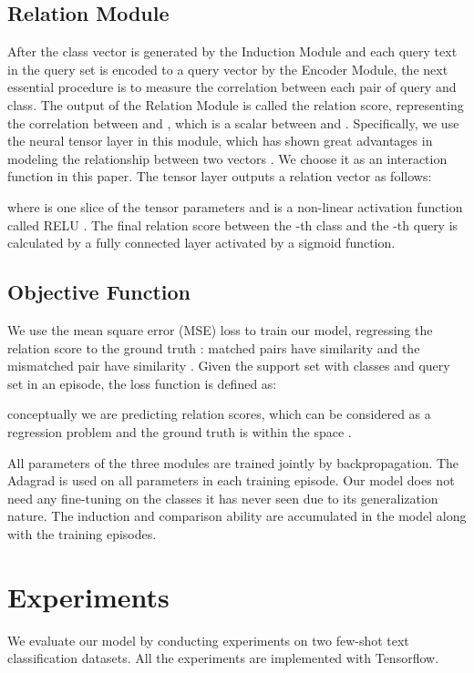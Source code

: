\documentclass[11pt,a4paper]{article}
\begin{document}
\subsection{Relation Module}
After the class vector  is generated by the Induction Module and each query text in the query set is encoded to a query vector  by the Encoder Module, the next essential procedure is to measure the correlation between each pair of query and class.
The output of the Relation Module is called the relation score, representing the correlation between  and , which is a scalar between  and . Specifically, we use the neural tensor layer \citep{socher2013reasoning} in this module, which has shown great advantages in modeling the relationship between two vectors \citep{wan2016deep,geng2017implicit}. We choose it as an interaction function in this paper. The tensor layer outputs a relation vector as follows:

where  is one slice of the tensor parameters and  is a non-linear activation function called RELU \citep{glorot2011deep}. The final relation score  between the -th class and the -th query is calculated by a fully connected layer activated by a sigmoid function.


\subsection{Objective Function}
We use the mean square error (MSE) loss to train our model, regressing the relation score  to the ground truth : matched pairs have similarity  and the mismatched pair have similarity . Given the support set  with  classes and query set  in an episode, the loss function is defined as:

conceptually we are predicting relation scores, which can be considered as a regression problem and the ground truth is within the space .

All parameters of the three modules are trained jointly by backpropagation. The Adagrad \cite{duchi2011adaptive} is used on all parameters in each training episode. 
Our model does not need any fine-tuning on the classes it has never seen due to its generalization nature. The induction and comparison ability are accumulated in the model along with the training episodes.

\section{Experiments}
We evaluate our model by conducting experiments on two few-shot text classification datasets. All the experiments are implemented with Tensorflow.
\end{document}
